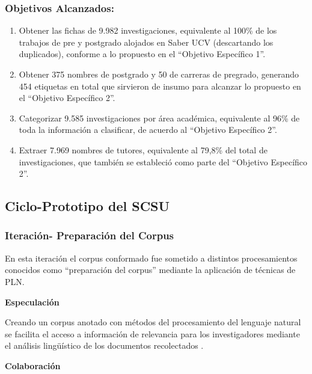\documentclass[
  12pt,
  openany]{book}
\begin{document}
\hypertarget{objetivos-alcanzados}{%
\subsubsection{Objetivos Alcanzados:}\label{objetivos-alcanzados}}

\begin{enumerate}
\def\labelenumi{\arabic{enumi}.}
\item
  Obtener las fichas de 9.982 investigaciones, equivalente al 100\% de los trabajos de pre y postgrado alojados en Saber UCV (descartando los duplicados), conforme a lo propuesto en el ``Objetivo Específico 1''.
\item
  Obtener 375 nombres de postgrado y 50 de carreras de pregrado, generando 454 etiquetas en total que sirvieron de insumo para alcanzar lo propuesto en el ``Objetivo Específico 2''.
\item
  Categorizar 9.585 investigaciones por área académica, equivalente al 96\% de toda la información a clasificar, de acuerdo al ``Objetivo Específico 2''.
\item
  Extraer 7.969 nombres de tutores, equivalente al 79,8\% del total de investigaciones, que también se estableció como parte del ``Objetivo Específico 2''.
\end{enumerate}

\newpage

\hypertarget{desarrollociclos3}{%
\subsection{Ciclo-Prototipo del SCSU}\label{desarrollociclos3}}

\hypertarget{iternlp}{%
\subsubsection{Iteración- Preparación del Corpus}\label{iternlp}}

En esta iteración el corpus conformado fue sometido a distintos procesamientos conocidos como ``preparación del corpus'' mediante la aplicación de técnicas de PLN.

\textbf{Especulación}

Creando un corpus anotado con métodos del procesamiento del lenguaje natural se facilita el acceso a información de relevancia para los investigadores mediante el análisis lingüístico de los documentos recolectados \citep{article}.

\textbf{Colaboración}
\end{document}

